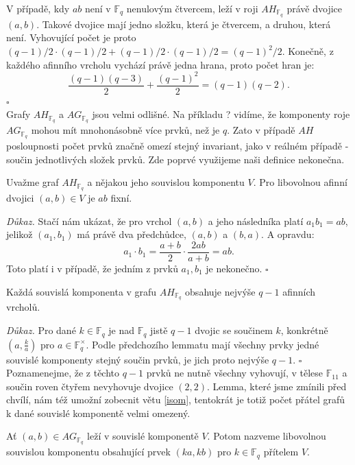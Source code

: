 \documentclass[12pt]{report}
\begin{document}
V případě, kdy $ab$ není v $\mathbb{F}_q$ nenulovým čtvercem, leží v roji $AH_{\mathbb{F}_q}$ právě dvojice $(a,b)$. Takové dvojice mají jedno složku, která je čtvercem, a druhou, která není. Vyhovující počet je proto $(q-1)/2 \cdot (q-1)/2 + (q-1)/2 \cdot (q-1)/2 = (q-1)^2/2$. Konečně, z každého afinního vrcholu vychází právě jedna hrana, proto počet hran je:
$$\frac{(q-1)(q-3)}{2}+\frac{(q-1)^2}{2} = (q-1)(q-2).$$  \hfill $\square$\\



Grafy $AH_{\mathbb{F}_q}$ a $AG_{\mathbb{F}_q}$ jsou velmi odlišné. Na příkladu ? vidíme, že komponenty roje $AG_{\mathbb{F}_q}$ mohou mít mnohonásobně více prvků, než je $q$. Zato v případě $AH$ posloupnosti počet prvků značně omezí stejný invariant, jako v reálném případě - součin jednotlivých složek prvků. Zde poprvé využijeme naši definice nekonečna.

\begin{lemma}\label{fix}
Uvažme graf $AH_{\mathbb{F}_q}$ a nějakou jeho souvislou komponentu $V$. Pro libovolnou afinní dvojici $(a,b) \in V$ je $ab$ fixní.
\end{lemma}
\noindent \textit{Důkaz.} Stačí nám ukázat, že pro vrchol $(a,b)$ a jeho následníka platí $a_1 b_1 = ab$, jelikož $(a_1,b_1)$ má právě dva předchůdce, $(a,b)$ a $(b,a)$. A opravdu:
\begin{equation*}
a_1 \cdot b_1 = \frac{a+b}{2} \cdot \frac{2ab}{a+b} = ab.
\end{equation*} 
Toto platí i v případě, že jedním z prvků $a_1,b_1$ je nekonečno.
\hfill $\square$\\

\begin{dusledek}\label{fixab}
Každá souvislá komponenta v grafu $AH_{\mathbb{F}_q}$ obsahuje nejvýše $q-1$ afinních vrcholů.
\end{dusledek}
\noindent \textit{Důkaz.} Pro dané $k \in \mathbb{F}_q$ je nad $\mathbb{F}_q$ jistě $q-1$ dvojic se součinem $k$, konkrétně $\left(a, \frac{k}{a}\right)$ pro $a \in \mathbb{F}_q ^{\times}$. Podle předchozího lemmatu mají všechny prvky jedné souvislé komponenty stejný součin prvků, je jich proto nejvýše $q-1$. \hfill $\square$\\

Poznamenejme, že z těchto $q-1$ prvků ne nutně všechny vyhovují, v tělese $\mathbb{F}_{11}$ a součin roven čtyřem nevyhovuje dvojice $(2,2)$. Lemma, které jsme zmínili před chvílí, nám též umožní zobecnit větu \ref{isom}, tentokrát je totiž počet přátel grafů k dané souvislé komponentě velmi omezený.
\begin{definice}
Ať $(a,b) \in AG_{\mathbb{F}_q}$ leží v souvislé komponentě $V$. Potom nazveme libovolnou souvislou komponentu obsahující prvek $(ka,kb)$ pro $k \in \mathbb{F}_q$ přítelem $V$.
\end{definice}
\end{document}
